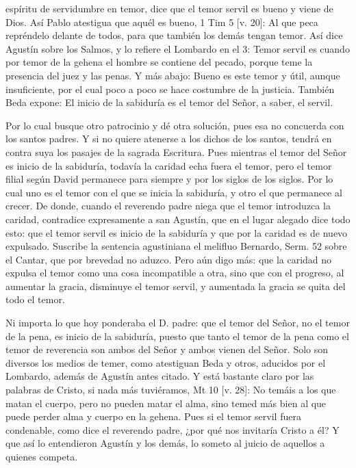 espíritu de servidumbre en temor, dice que el temor servil es bueno y viene de Dios. Así Pablo atestigua que aquél es bueno, 1 Tim 5 [v. 20]: Al que peca repréndelo delante de todos, para que también los demás tengan temor. Así dice Agustín sobre los Salmos, y lo refiere el Lombardo en el 3: Temor servil es cuando por temor de la gehena el hombre se contiene del pecado, porque teme la presencia del juez y las penas. Y más abajo: Bueno es este temor y útil, aunque insuficiente, por el cual poco a poco se hace costumbre de la justicia. También Beda expone: El inicio de la sabiduría es el temor del Señor, a saber, el servil.

Por lo cual busque otro patrocinio y dé otra solución, pues esa no concuerda con los santos padres. Y si no quiere atenerse a los dichos de los santos, tendrá en contra suya los pasajes de la sagrada Escritura. Pues mientras el temor del Señor es inicio de la sabiduría, todavía la caridad echa fuera el temor, pero el temor filial según David permanece para siempre y por los siglos de los siglos. Por lo cual uno es el temor con el que se inicia la sabiduría, y otro el que permanece al crecer. De donde, cuando el reverendo padre niega que el temor introduzca la caridad, contradice expresamente a san Agustín, que en el lugar alegado dice todo esto: que el temor servil es inicio de la sabiduría y que por la caridad es de nuevo expulsado. Suscribe la sentencia agustiniana el melifluo Bernardo, Serm. 52 sobre el Cantar, que por brevedad no aduzco. Pero aún digo más: que la caridad no expulsa el temor como \marginpar{\small[367]} una cosa incompatible a otra, sino que con el progreso, al aumentar la gracia, disminuye el temor servil, y aumentada la gracia se quita del todo el temor.

Ni importa lo que hoy ponderaba el D. padre: que el temor del Señor, no el temor de la pena, es inicio de la sabiduría, puesto que tanto el temor de la pena como el temor de reverencia son ambos del Señor y ambos vienen del Señor. Solo son diversos los medios de temer, como atestiguan Beda y otros, aducidos por el Lombardo, además de Agustín antes citado. Y está bastante claro por las palabras de Cristo, si nada más tuviéramos, Mt 10 [v. 28]: No temáis a los que matan el cuerpo, pero no pueden matar el alma, sino temed más bien al que puede perder alma y cuerpo en la gehena. Pues si el temor servil fuera condenable, como dice el reverendo padre, ¿por qué nos invitaría Cristo a él? Y que así lo entendieron Agustín y los demás, lo someto al juicio de aquellos a quienes competa.

